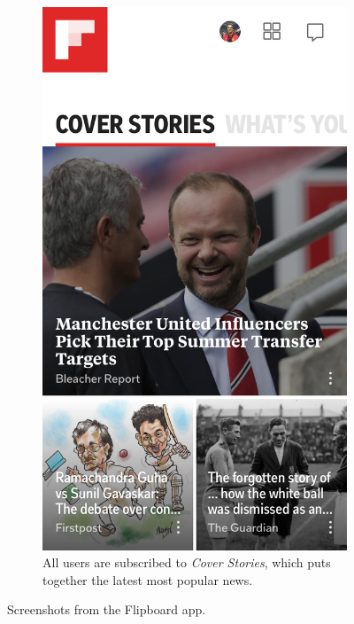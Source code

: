 \documentclass[12pt]{article}
\begin{document}
\begin{figure}[H]
\begin{subfigure}[t]{0.3\textwidth}
        \label{FlipboardHome}
    \end{subfigure}
    \qquad
    \begin{subfigure}[t]{0.3\textwidth}
    \includegraphics[width=\textwidth]{Flipboard.PNG}
   \caption{All users are subscribed to \emph{Cover Stories}, which puts together the latest most popular news.}
   \label{FlipboardDailyEdition}
   \end{subfigure}
   \caption[Screenshots from the Flipboard app]{Screenshots from the Flipboard app.}
\end{figure}
\end{document}
